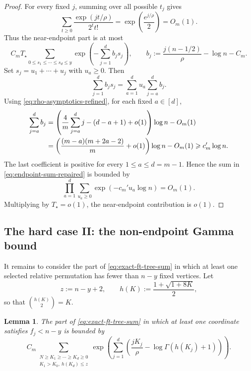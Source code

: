 \documentclass[11pt,reqno]{amsart}
\newtheorem{lemma}[theorem]{Lemma}
\theoremstyle{definition}
\theoremstyle{remark}
\renewcommand\le{\leqslant}
\renewcommand\ge{\geqslant}
\begin{document}
\begin{proof}
For every fixed $j$, summing over all possible $t_j$ gives
\[
        \sum_{t\ge0}\frac{\exp(jt/\rho)}{2^t t!}
        =\exp\left(\frac{e^{j/\rho}}2\right)=O_m(1).
\]
Thus the near-endpoint part is at most
\begin{equation}\label{eq:endpoint-sum-repaired}
        C_mT_\star
        \sum_{0\le s_1\le\cdots\le s_d\le y}
        \exp\left(-\sum_{j=1}^d b_js_j\right),
        \qquad
        b_j:=\frac{j(n-1/2)}\rho-\log n-C_m .
\end{equation}
Set $s_j=u_1+\cdots+u_j$ with $u_a\ge0$. Then
\[
        \sum_{j=1}^d b_js_j
        =\sum_{a=1}^d u_a\sum_{j=a}^d b_j .
\]
Using \eqref{eq:rho-asymptotics-refined}, for each fixed $a\in[d]$,
\begin{align}\label{eq:suffix-positive-repaired}
        \sum_{j=a}^d b_j
        &=\left(\frac4m\sum_{j=a}^d j-(d-a+1)+o(1)\right)\log n-O_m(1) \\
        &=\left(\frac{(m-a)(m+2a-2)}m+o(1)\right)\log n-O_m(1)
          \ge c_m'\log n . \notag
\end{align}
The last coefficient is positive for every $1\le a\le d=m-1$. Hence the sum in \eqref{eq:endpoint-sum-repaired} is bounded by
\[
        \prod_{a=1}^d\sum_{u_a\ge0}\exp(-c_m'u_a\log n)=O_m(1).
\]
Multiplying by $T_\star=o(1)$, the near-endpoint contribution is $o(1)$.
\end{proof}



\subsection{The hard case II: the non-endpoint Gamma bound}\label{subsec:hard_regime_non}

It remains to consider the part of \eqref{eq:exact-ft-tree-sum} in which at least one selected relative permutation has fewer than $n-y$ fixed vertices. Let
\[
        z:=n-y+2,
        \qquad
        h(K):=\frac{1+\sqrt{1+8K}}2,
\]
so that $\binom{h(K)}2=K$.

\begin{lemma}\label{lem:nonendpoint-gamma-reduction}
The part of \eqref{eq:exact-ft-tree-sum} in which at least one coordinate satisfies $f_j<n-y$ is bounded by
\begin{equation}\label{eq:nonendpoint-gamma-sum}
        C_m\sum_{\substack{N\ge K_1\ge\cdots\ge K_d\ge0\\ K_1>K_0,\ h(K_d)\le z}}
        \exp\left(\sum_{j=1}^d\left(
        \frac{jK_j}\rho-\log\Gamma(h(K_j)+1)\right)\right).
\end{equation}
\end{lemma}
\end{document}
